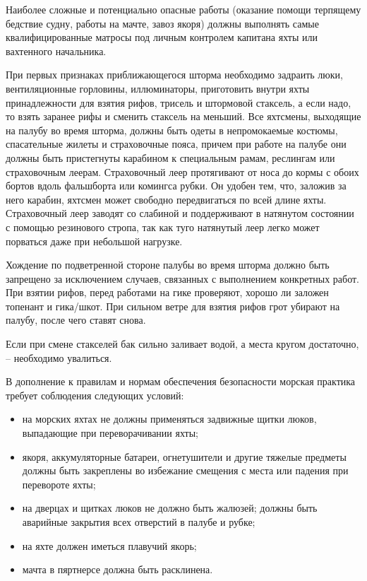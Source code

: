 \documentclass[a4paper, 12pt, twoside, final, book, russian, fittopage, cyremdash]{ncc}
\begin{document}
Наиболее сложные и потенциально опасные работы (оказание помощи терпящему бедствие судну, работы на мачте, завоз якоря) должны выполнять самые квалифицированные матросы под личным контролем капитана яхты или вахтенного начальника.

При первых признаках приближающегося шторма необходимо задраить люки, вентиляционные горловины, иллюминаторы, приготовить внутри яхты принадлежности для взятия рифов, трисель и штормовой стаксель, а если надо, то взять заранее рифы и сменить стаксель на меньший. Все яхтсмены, выходящие на палубу во время шторма, должны быть одеты в непромокаемые костюмы, спасательные жилеты и страховочные пояса, причем при работе на палубе они должны быть пристегнуты карабином к специальным рамам, реслингам или страховочным леерам. Страховочный леер протягивают от носа до кормы с обоих бортов вдоль фальшборта или комингса рубки. Он удобен тем, что, заложив за него карабин, яхтсмен может свободно передвигаться по всей длине яхты. Страховочный леер заводят со слабиной и поддерживают в натянутом состоянии с помощью резинового стропа, так как туго натянутый леер легко может порваться даже при небольшой нагрузке.

Хождение по подветренной стороне палубы во время шторма должно быть запрещено за исключением случаев, связанных с выполнением конкретных работ. При взятии рифов, перед работами на гике проверяют, хорошо ли заложен топенант и гика\-/шкот. При сильном ветре для взятия рифов грот убирают на палубу, после чего ставят снова.

Если при смене стакселей бак сильно заливает водой, а места кругом достаточно, \--- необходимо увалиться. 

В дополнение к правилам и нормам обеспечения безопасности морская практика требует соблюдения следующих условий:
\begin{itemize}
\item на морских яхтах не должны применяться задвижные щитки люков, выпадающие при переворачивании яхты; 
\item якоря, аккумуляторные батареи, огнетушители и другие тяжелые предметы должны быть закреплены во избежание смещения с места или падения при перевороте яхты; 
\item на дверцах и щитках люков не должно быть жалюзей; должны быть аварийные закрытия всех отверстий в палубе и рубке; 
\item на яхте должен иметься плавучий якорь; 
\item мачта в пяртнерсе должна быть расклинена. 
\end{itemize}
\end{document}
